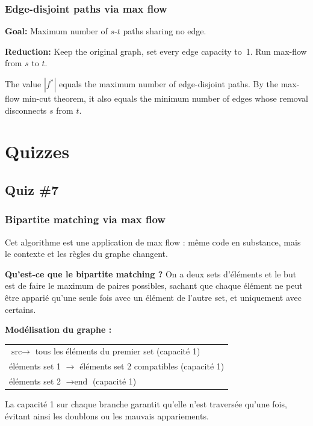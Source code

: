 \documentclass[11pt,a4paper,openany]{book}
\begin{document}
\subsection{Edge-disjoint paths via max flow}

\begin{thmbox}[title=Algorithm]
\textbf{Goal:} Maximum number of $s$-$t$ paths sharing no edge.

\textbf{Reduction:} Keep the original graph, set every edge capacity to~1.
Run max-flow from $s$ to $t$.

The value $|f^*|$ equals the maximum number of edge-disjoint paths.
By the max-flow min-cut theorem, it also equals the minimum number of edges whose
removal disconnects $s$ from $t$.
\end{thmbox}


\chapter{Quizzes}

\section{Quiz \#7}

\subsection{Bipartite matching via max flow}

\begin{exbox}[title=Bipartite matching via max flow — student notes]
\small\raggedright
Cet algorithme est une application de max flow : même code en substance, mais le
contexte et les règles du graphe changent.

\textbf{Qu'est-ce que le bipartite matching ?} On a deux sets d'éléments et le but
est de faire le maximum de paires possibles, sachant que chaque élément ne peut être
apparié qu'une seule fois avec un élément de l'autre set, et uniquement avec certains.

\textbf{Modélisation du graphe :}
\begin{center}
\begin{tabular}{l}
$\text{src} \to$ tous les éléments du premier set (capacité 1) \\
éléments set 1 $\to$ éléments set 2 compatibles (capacité 1) \\
éléments set 2 $\to \text{end}$ (capacité 1)
\end{tabular}
\end{center}

La capacité 1 sur chaque branche garantit qu'elle n'est traversée qu'une fois, évitant
ainsi les doublons ou les mauvais appariements.
\end{exbox}
\end{document}
